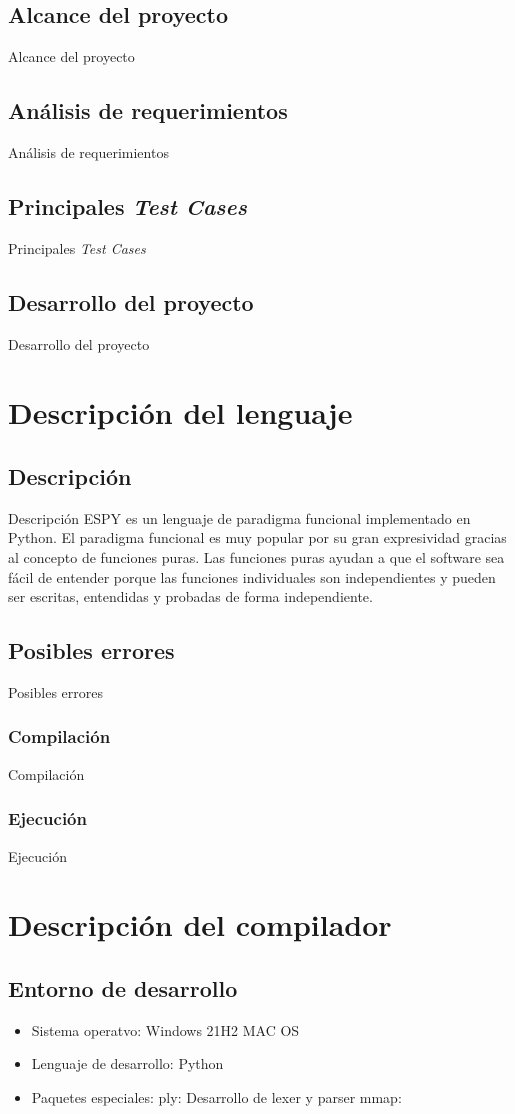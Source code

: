 \documentclass[12pt,letterpaper, titlepage, onecolumn]{article}
\begin{document}
	\subsection{Alcance del proyecto}
	Alcance del proyecto
	\subsection{Análisis de requerimientos}
	Análisis de requerimientos
	\subsection{Principales \textsl{Test Cases}}
	Principales \textsl{Test Cases}
	\subsection{Desarrollo del proyecto}
	Desarrollo del proyecto

\section{Descripción del lenguaje}
	\subsection{Descripción}
	Descripción
	ESPY es un lenguaje de paradigma funcional implementado en Python. 
	El paradigma funcional es muy popular por su gran expresividad gracias al concepto de 
	funciones puras. Las funciones puras ayudan a que el software sea fácil de entender porque 
	las funciones individuales son independientes y pueden ser escritas, entendidas y probadas 
	de forma independiente.
	\subsection{Posibles errores}
	Posibles errores
	\subsubsection{Compilación}
	Compilación
	\subsubsection{Ejecución}
	Ejecución

\section{Descripción del compilador}
	\subsection{Entorno de desarrollo}
		\begin{itemize}
			\item Sistema operatvo: 
				\subitem Windows 21H2
				\subitem MAC OS
			\item Lenguaje de desarrollo: 
				\subitem Python
			\item Paquetes especiales:
				\subitem ply: Desarrollo de lexer y parser
				\subitem mmap: 
		\end{itemize}
\end{document}
